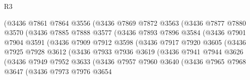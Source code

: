 \begin{lexlean}{R3}
\begin{coremodule}
                      (@3436
                        @7861
                        @7864
                        @3556
                        (@3436
                          @7869
                          @7872
                          @3563
                          (@3436
                            @7877
                            @7880
                            @3570
                            (@3436
                              @7885
                              @7888
                              @3577
                              (@3436
                                @7893
                                @7896
                                @3584
                                (@3436
                                  @7901
                                  @7904
                                  @3591
                                  (@3436
                                    @7909
                                    @7912
                                    @3598
                                    (@3436
                                      @7917
                                      @7920
                                      @3605
                                      (@3436
                                        @7925
                                        @7928
                                        @3612
                                        (@3436
                                          @7933
                                          @7936
                                          @3619
                                          (@3436
                                            @7941
                                            @7944
                                            @3626
                                            (@3436
                                              @7949
                                              @7952
                                              @3633
                                              (@3436
                                                @7957
                                                @7960
                                                @3640
                                                (@3436
                                                  @7965
                                                  @7968
                                                  @3647
                                                  (@3436
                                                    @7973
                                                    @7976
                                                    @3654

\end{coremodule}
\end{lexlean}
